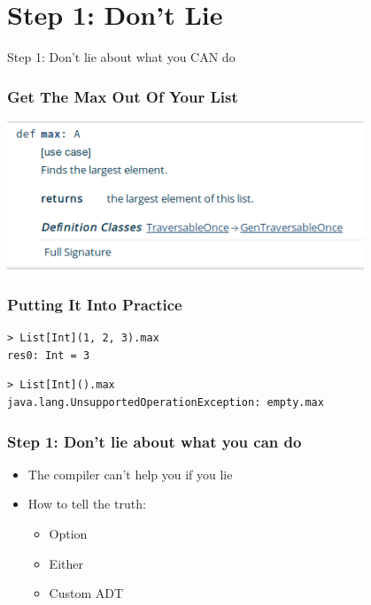 \documentclass{beamer}
\begin{document}
\section{Step 1: Don't Lie}

\begin{frame}[c]
  \begin{center}
    \Large Step 1: Don't lie about what you CAN do
  \end{center}
\end{frame}

\begin{frame}[fragile]
  \frametitle{Get The Max Out Of Your List}
  \includegraphics[width=0.8\textwidth]{../pics/list-max.png}
\end{frame}

\begin{frame}
  \frametitle{Putting It Into Practice}
  \begin{verbatim}
> List[Int](1, 2, 3).max
res0: Int = 3
\end{verbatim}
\begin{verbatim}
> List[Int]().max                                                             
java.lang.UnsupportedOperationException: empty.max                                 
\end{verbatim}
\end{frame}

\begin{frame}
  \frametitle{Step 1: Don't lie about what you can do}
  \begin{itemize}
  \item The compiler can't help you if you lie
  \item How to tell the truth:
    \begin{itemize}
    \item Option
    \item Either
    \item Custom ADT
    \end{itemize}
  \end{itemize}
\end{frame}
\end{document}
